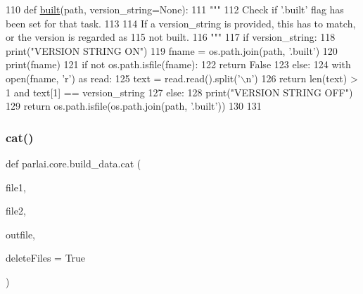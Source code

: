 \begin{DoxyCode}
110 \textcolor{keyword}{def }\hyperlink{namespaceparlai_1_1core_1_1build__data_ad834e1a9be02e18a6c2de2b03b9a8f10}{built}(path, version\_string=None):
111     \textcolor{stringliteral}{"""}
112 \textcolor{stringliteral}{    Check if '.built' flag has been set for that task.}
113 \textcolor{stringliteral}{}
114 \textcolor{stringliteral}{    If a version\_string is provided, this has to match, or the version is regarded as}
115 \textcolor{stringliteral}{    not built.}
116 \textcolor{stringliteral}{    """}
117     \textcolor{keywordflow}{if} version\_string:
118         print(\textcolor{stringliteral}{"VERSION STRING ON"})
119         fname = os.path.join(path, \textcolor{stringliteral}{'.built'})
120         print(fname)
121         \textcolor{keywordflow}{if} \textcolor{keywordflow}{not} os.path.isfile(fname):
122             \textcolor{keywordflow}{return} \textcolor{keyword}{False}
123         \textcolor{keywordflow}{else}:
124             with open(fname, \textcolor{stringliteral}{'r') as read:}
125 \textcolor{stringliteral}{                text = read.read().split('\(\backslash\)n'})
126             \textcolor{keywordflow}{return} len(text) > 1 \textcolor{keywordflow}{and} text[1] == version\_string
127     \textcolor{keywordflow}{else}:
128         print(\textcolor{stringliteral}{"VERSION STRING OFF"})
129         \textcolor{keywordflow}{return} os.path.isfile(os.path.join(path, \textcolor{stringliteral}{'.built'}))
130 
131 
\end{DoxyCode}
\mbox{\label{namespaceparlai_1_1core_1_1build__data_adc4feba864e2a0d0663cdf6bf84afaf6}} 
\subsubsection{\texorpdfstring{cat()}{cat()}}
{\footnotesize\ttfamily def parlai.\+core.\+build\+\_\+data.\+cat (\begin{DoxyParamCaption}\item[{}]{file1,  }\item[{}]{file2,  }\item[{}]{outfile,  }\item[{}]{delete\+Files = {\ttfamily True} }\end{DoxyParamCaption})}

